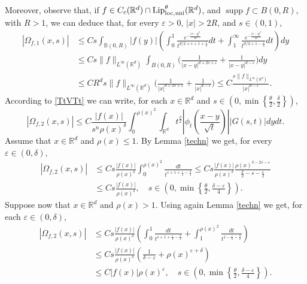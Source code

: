 \documentclass[10pt, a4paper, reqno]{amsart}
\theoremstyle{definition}
\theoremstyle{remark}
\DeclareMathOperator{\supp}{supp}
\numberwithin{equation}{section}
\begin{document}
Moreover, observe that, if $f\in C_c(\mathbb R^d)\cap {\textup{Lip}}^\theta_{\rm loc, uni}(\mathbb R^d)$, and $\supp f\subset B(0,R)$, with $R>1$, we can deduce that, for every $\varepsilon >0$, $|x|>2R$, and $s\in (0,1)$, 
\begin{align}\label{Omega1b}
 |\Omega_{f,1}(x,s)|&\leq Cs\int_{\mathbb B(0,R)} |f(y)|\left(\int_0^1\frac{e^{-\frac{|x-y|^2}{4t}}}{t^{d/2+s+1+\tfrac{\varepsilon}{2}}}dt+\int_1^\infty \frac{e^{-\frac{|x-y|^2}{4t}}}{t^{d/2+1-\tfrac{\varepsilon}{2}}}dt\right)dy\nonumber\\
 &\leq Cs\|f\|_{L^\infty (\mathbb R^d)}\int_{B(0,R)}\Big(\frac{1}{|x-y|^{d+2s+\varepsilon}}+\frac{1}{|x-y|^{d-\varepsilon}}\Big)dy\nonumber\\
  &\leq CR^ds\|f\|_{L^\infty (\mathbb R^d)}\Big(\frac{1}{|x|^{d+2s+\varepsilon}}+\frac{1}{|x|^{d-\varepsilon}}\Big)\leq C\frac{s\|f\|_{L^\infty (\mathbb R^d)}}{|x|^{d-\varepsilon}}.
\end{align}
According to \eqref{TtVTt} we can write, for each $x\in \mathbb R^d$ and $s\in (0,\min\left\{\tfrac{\theta}{2},\tfrac{\delta}{2}\right\})$,
\[
|\Omega_{f,2}(x,s)|\leq C\frac{|f(x)|}{s^n\rho (x)^\delta}\int_0^{\rho (x)^2}\int_{\mathbb R^d}t^{\tfrac{\delta}{2}}\left|\phi _t\left(\frac{x-y}{\sqrt{t}}\right)\right||G(s,t)|dydt.
\]
Assume that $x\in \mathbb R^d$ and $\rho (x)\leq 1$. By Lemma \ref{techn} we get, for every $\varepsilon \in (0,\delta)$, 
\begin{align}\label{Omega2a}
 |\Omega_{f,2}(x,s)|&\leq Cs\frac{|f(x)|}{\rho(x)^\delta}\int_0^{\rho(x)^2} \frac{dt}{t^{s+1+\tfrac{\varepsilon}{2}-\tfrac{\delta}{2}}}\leq Cs\frac{|f(x)|}{\rho (x)^\delta }\frac{\rho (x)^{\delta -2s-\varepsilon}}{\tfrac{\delta}{2}-s-\tfrac{\varepsilon}{2}}\nonumber\\
    &\leq Cs\frac{|f(x)|}{\rho (x)^\delta},\quad s\in \left(0,\min\left\{ \tfrac{\theta }{2},\tfrac{\delta-\varepsilon}{4}\right\}\right).
\end{align}
Suppose now that $x\in\mathbb R^d$ and $\rho (x)>1$. Using again Lemma \ref{techn} we get, for each $\varepsilon \in (0,\delta)$, 
\begin{align}\label{Omega2b}
 |\Omega_{f,2}(x,s)|&\leq Cs\frac{|f(x)|}{\rho(x)^\delta}\left(\int_0^1\frac{dt}{t^{s+1+\tfrac{\varepsilon}{2}-\tfrac{\delta}{2}}}+\int_1^{\rho (x)^2} \frac{dt}{t^{1-\tfrac{\varepsilon}{2}-\tfrac{\delta}{2}}}\right)\nonumber\\
    &\leq Cs\frac{|f(x)|}{\rho (x)^\delta}\left(\frac{1}{\delta -\varepsilon}+\rho (x)^{\varepsilon +\delta}\right)\nonumber\\
    &\leq C|f(x)|\rho (x)^\varepsilon,\quad s\in \left(0,\min\left\{ \tfrac{\theta }{2},\tfrac{\delta-\varepsilon}{4}\right\}\right).
\end{align}
\end{document}
